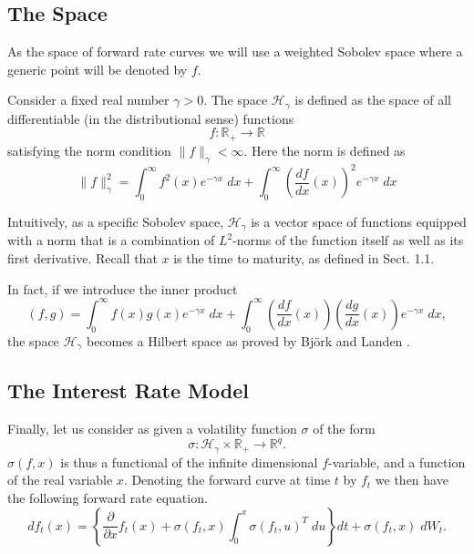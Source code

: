 \subsection{The Space}
As the space of forward rate curves we will use a weighted Sobolev
space where a generic point will be denoted by $f$.
\begin{defn}
Consider a fixed real number $\gamma > 0$. The space
$\mathcal{H}_\gamma$ is defined as the space of all differentiable (in
the distributional sense) functions 
$$
f: \mathbb{R}_+ \longrightarrow \mathbb{R}
$$
satisfying the norm condition $\| f \|_\gamma < \infty$. Here the norm
is defined as 
$$
\|f\|^2_\gamma= \int_0^\infty f^2(x) e^{-\gamma x}\; dx+\int_0^\infty
\left(\frac{df}{dx}(x)\right)^2e^{-\gamma  x}\; dx 
$$
\end{defn}
Intuitively, as a specific Sobolev space, $\mathcal{H}_\gamma$ is a
vector space of functions equipped with a norm that is a combination
of $L^2$-norms of the function itself as well as its first
derivative. Recall that $x$ is the time to maturity, as defined in
Sect. 1.1. 

In fact, if we introduce the inner product
$$
(f,g)= \int_0^\infty f(x)g(x) e^{-\gamma x}\; dx+\int_0^\infty
\left(\frac{df}{dx}(x)\right)\left(\frac{dg}{dx}(x)\right) e^{-\gamma
  x}\; dx,
$$
the space $\mathcal{H}_\gamma$ becomes a Hilbert space as proved by
Bj\"ork and Landen \cite{BL:2002}.    
\subsection{The Interest Rate Model}
Finally, let us consider as given a volatility function $\sigma$ of
the form 
$$
\sigma: \mathcal{H}_\gamma \times \mathbb{R}_+ \rightarrow \mathbb{R}^q.
$$
$\sigma(f,x)$ is thus a functional of the infinite dimensional
$f$-variable, and a function of the real variable $x$. Denoting the
forward curve at time $t$ by $f_t$ we then have the following forward
rate equation.
\begin{equation}
\label{GeomHJMM}
df_t(x)=\left\{\frac{\partial}{\partial
    x}f_t(x)+\sigma(f_t,x)\int_0^x \sigma(f_t,u)^T\; du \right\} dt+ 
\sigma(f_t,x)\; dW_t.
\end{equation}
